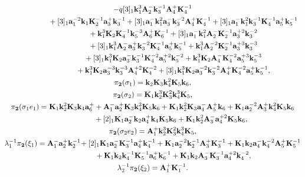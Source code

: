 \documentclass[pdftex]{sigma}
\def\bk{{\bf k}}
\def\bK{{\bf K}}
\begin{document}
\begin{gather*}
 - q [3]_1 \bk^{3}_1 {\bf A}^-_2 \bk^{-1}_3 {\bf A}^+_4 \bK^{-1}_4\\
\hphantom{\lambda_2^{-1}\pi_{\bf 1}(\xi_2)=}{}
 + [3]_1 {\bf a}_1^{-2} \bk_1 \bK^{-1}_2 {\bf a}^+_3 \bk^{-1}_3
 + [3]_1 {\bf a}^-_1 \bk^{2}_1 {\bf a}^-_3 \bk^{-2}_3 {\bf A}^+_4 \bK^{-1}_4
 + [3]_1 {\bf a}^-_1 \bk^{2}_1 \bk^{-1}_3 \bK^{-1}_4 {\bf a}^+_5 \bk^{-1}_5\\
\hphantom{\lambda_2^{-1}\pi_{\bf 1}(\xi_2)=}{}
 + \bk^{3}_1 \bK_2 \bK^{-1}_4 \bk^{-3}_5 {\bf A}^+_6 \bK^{-1}_6
 + [3]_1 {\bf a}^-_1 \bk^{2}_1 {\bf A}^-_2 \bK^{-1}_2 {\bf a}_3^{+2} \bk^{-2}_3
\\
\hphantom{\lambda_2^{-1}\pi_{\bf 1}(\xi_2)=}{}
 + [3]_1 \bk^{3}_1 {\bf A}^-_2 {\bf a}^+_3 \bk^{-2}_3 \bK^{-1}_4 {\bf a}^+_5 \bk^{-1}_5
 + \bk^{3}_1 {\bf A}_2^{-2} \bK^{-1}_2 {\bf a}_3^{+3} \bk^{-3}_3
\\
\hphantom{\lambda_2^{-1}\pi_{\bf 1}(\xi_2)=}{}
 + [3]_1 \bk^{3}_1 \bK_2 {\bf a}^-_3 \bk^{-1}_3 \bK^{-2}_4 {\bf a}_5^{+2} \bk^{-2}_5
 + \bk^{3}_1 \bK_2  {\bf A}^-_4 \bK^{-2}_4 {\bf a}_5^{+3} \bk^{-3}_5\\
\hphantom{\lambda_2^{-1}\pi_{\bf 1}(\xi_2)=}{}
 + \bk^{3}_1 \bK_2 {\bf a}_3^{-3} \bk^{-3}_3 {\bf A}_4^{+2} \bK^{-2}_4
 + [3]_1 \bk^{3}_1 \bK_2 {\bf a}_3^{-2} \bk^{-2}_3 {\bf A}^+_4 \bK^{-2}_4 {\bf a}^+_5
\bk^{-1}_5,\\
\pi_{\bf 2}(\sigma_1)=\bk_2 \bK_3 \bk^{2}_4 \bK_5 \bk_6,\\
\pi_{\bf 2}(\sigma_2)=\bK_1 \bk^{3}_2 \bK^{2}_3 \bk^{3}_4 \bK_5,\\
\pi_{\bf 2}(\sigma_1e_1)=\bK_1 \bk^{2}_2 \bK_3 \bk_4 {\bf a}^+_6
 + {\bf A}^-_1 {\bf a}^+_2 \bK_3 \bk^{2}_4 \bK_5 \bk_6
 + \bK_1 \bk^{2}_2 \bK_3 {\bf a}^-_4 {\bf A}^+_5 \bk_6
 + \bK_1 {\bf a}_2^{-2} {\bf A}^+_3 \bk^{2}_4 \bK_5 \bk_6\\
\hphantom{\pi_{\bf 2}(\sigma_1e_1)=}{}
 + [2]_1 \bK_1 {\bf a}^-_2 \bk_2 {\bf a}^+_4 \bk_4 \bK_5 \bk_6
 + \bK_1 \bk^{2}_2 {\bf A}^-_3 {\bf a}_4^{+2} \bK_5 \bk_6,\\
\pi_{\bf 2}(\sigma_2e_2)={\bf A}^+_1 \bk^{3}_2 \bK^{2}_3 \bk^{3}_4 \bK_5,\\
\lambda_1^{-1}\pi_{\bf 2}(\xi_1)={\bf A}^-_1 {\bf a}^+_2 \bk^{-1}_2\!
 + [2]_1 \bK_1 {\bf a}^-_2 \bK^{-1}_3 {\bf a}^+_4 \bk^{-1}_4
 + \bK_1 {\bf a}_2^{-2} \bk^{-1}_2 {\bf A}^+_3 \bK^{-1}_3
 + \bK_1 \bk_2 {\bf a}^-_4 \bk^{-2}_4 {\bf A}^+_5 \bK^{-1}_5\\
\hphantom{\lambda_1^{-1}\pi_{\bf 2}(\xi_1)=}{}
 + \bK_1 \bk_2 \bk^{-1}_4 \bK^{-1}_5 {\bf a}^+_6 \bk^{-1}_6
 + \bK_1 \bk_2 {\bf A}^-_3 \bK^{-1}_3 {\bf a}_4^{+2} \bk^{-2}_4,\\
\lambda_2^{-1}\pi_{\bf 2}(\xi_2)={\bf A}^+_1 \bK^{-1}_1.
\end{gather*}
\end{document}
